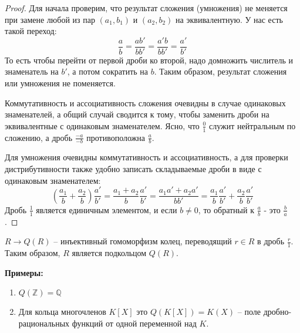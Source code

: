 \begin{proof}
    Для начала проверим, что результат сложения (умножения) не меняется при замене любой из пар $(a_1, b_1)$ и $(a_2, b_2)$ на эквивалентную.
    У нас есть такой переход:
    \[ \frac{a}{b} = \frac{ab'}{bb'} = \frac{a'b}{bb'} = \frac{a'}{b'} \]
    То есть чтобы перейти от первой дроби ко второй, надо домножить числитель и знаменатель на $b'$, а потом сократить на $b$. Таким образом, результат сложения или умножения не поменяется.
    
    Коммутативность и ассоциативность сложения очевидны в случае одинаковых знаменателей, а общий случай сводится к тому, чтобы заменить дроби на эквивалентные с одинаковым знаменателем.
    Ясно, что $\frac{0}{1}$ служит нейтральным по сложению, а дробь $\frac{-a}{-b}$ противоположна $\frac{a}{b}$.
    
    Для умножения очевидны коммутативность и ассоциативность, 
    а для проверки дистрибутивности также удобно записать складываемые дроби в виде с одинаковым знаменателем:
    \[ (\frac{a_1}{b} + \frac{a_2}{b})\frac{a'}{b'} = \frac{a_1 + a_2}{b}\frac{a'}{b'} 
    = \frac{a_1a' + a_2a'}{bb'} = \frac{a_1}{b}\frac{a'}{b'} + \frac{a_2}{b}\frac{a'}{b'} \]
    Дробь $\frac{1}{1}$ является единичным элементом, и если $b \neq 0$, то обратный к $\frac{a}{b}$ - это $\frac{b}{a}$.
\end{proof}

\begin{notice}
    $R \to Q(R)$ -- инъективный гомоморфизм колец, переводящий $r \in R$ в дробь $\frac{r}{1}$. Таким образом, $R$ является подкольцом $Q(R)$.
\end{notice}

\textbf{Примеры:}
\begin{enumerate}
    \item $Q(\mathbb{Z}) = \mathbb{Q}$
    \item Для кольца многочленов $K[X]$ это $Q(K[X]) = K(X)$ -- поле дробно-рациональных функций от одной переменной над $K$.
\end{enumerate}